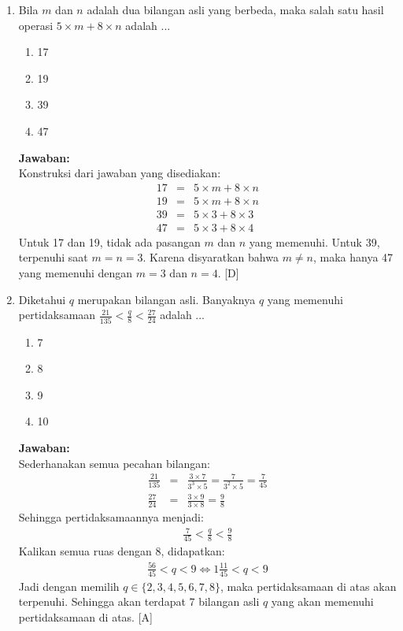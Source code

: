 \documentclass{article}
\begin{document}
\begin{enumerate}
  
  \item Bila $m$ dan $n$ adalah dua bilangan asli yang berbeda, maka salah satu hasil operasi $5\times m + 8 \times n$ adalah ...
        \begin{enumerate}
        \item[(A)] 17
        \item[(B)] 19
        \item[(C)] 39
        \item[(D)] 47
    \end{enumerate} 
      \textbf{Jawaban:}\\
      Konstruksi dari jawaban yang disediakan:
      \begin{eqnarray*}
      17 &=& 5\times m + 8 \times n \\
      19 &=& 5\times m + 8 \times n \\
      39 &=& 5\times 3 + 8 \times 3 \\
      47 &=& 5\times 3 + 8 \times 4 
      \end{eqnarray*}
      Untuk 17 dan 19, tidak ada pasangan $m$ dan $n$ yang memenuhi. Untuk 39, terpenuhi saat $m=n=3$. Karena disyaratkan bahwa $m\neq n$, maka hanya 47 yang memenuhi dengan $m=3$ dan $n=4$. [D]
  
  
  \item Diketahui $q$ merupakan bilangan asli. Banyaknya $q$ yang memenuhi pertidaksamaan $\frac{21}{135}<\frac{q}{8}<\frac{27}{24}$ adalah ...
          \begin{enumerate}
        \item[(A)] 7
        \item[(B)] 8
        \item[(C)] 9
        \item[(D)] 10
    \end{enumerate} 
  \textbf{Jawaban:}\\
  Sederhanakan semua pecahan bilangan:
  \begin{eqnarray*}
  \frac{21}{135} &=& \frac{3 \times 7}{3^3 \times 5} = \frac{7}{3^2 \times 5} = \frac{7}{45}\\
  \frac{27}{24} &=& \frac{3\times 9}{3 \times 8} = \frac{9}{8}
  \end{eqnarray*}
  Sehingga pertidaksamaannya menjadi:
  \begin{eqnarray*}
    \frac{7}{45}<\frac{q}{8}<\frac{9}{8}
  \end{eqnarray*}
  Kalikan semua ruas dengan 8, didapatkan:
  \begin{eqnarray*}
    \frac{56}{45}<q<9 \iff 1\frac{11}{45}<q<9
  \end{eqnarray*}
  Jadi dengan memilih $q\in \{2,3,4,5,6,7,8 \}$, maka pertidaksamaan di atas akan terpenuhi. Sehingga akan terdapat 7 bilangan asli $q$ yang akan memenuhi pertidaksamaan di atas. [A]
  

\end{enumerate}
\end{document}
